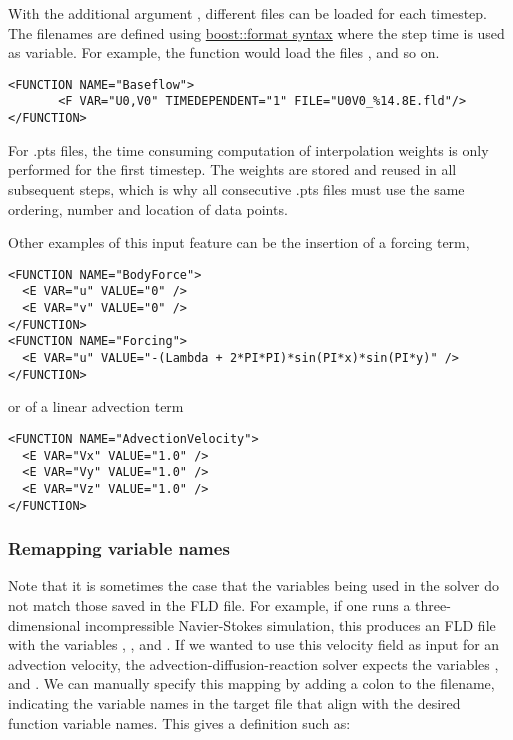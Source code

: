 With the additional argument , different files can be
loaded for each timestep. The filenames are defined using
\href{http://www.boost.org/doc/libs/1_56_0/libs/format/doc/format.html#syntax}{boost::format syntax}
where the step time is used as variable. For example, the function
 would load the files ,
 and so on.

\begin{lstlisting}[style=XMLStyle]
<FUNCTION NAME="Baseflow">
       <F VAR="U0,V0" TIMEDEPENDENT="1" FILE="U0V0_%14.8E.fld"/>
</FUNCTION>
\end{lstlisting}

For .pts files, the time consuming computation of interpolation weights is only
performed for the first timestep. The weights are stored and reused in all subsequent steps, 
which is why all consecutive .pts files must use the same ordering, number and location of
data points.

Other examples of this input feature can be the insertion of a forcing term,

\begin{lstlisting}[style=XMLStyle]
<FUNCTION NAME="BodyForce">
  <E VAR="u" VALUE="0" />
  <E VAR="v" VALUE="0" />
</FUNCTION>
<FUNCTION NAME="Forcing">
  <E VAR="u" VALUE="-(Lambda + 2*PI*PI)*sin(PI*x)*sin(PI*y)" />
</FUNCTION>
\end{lstlisting}

or of a linear advection term

\begin{lstlisting}[style=XMLStyle]
<FUNCTION NAME="AdvectionVelocity">
  <E VAR="Vx" VALUE="1.0" />
  <E VAR="Vy" VALUE="1.0" />
  <E VAR="Vz" VALUE="1.0" />
</FUNCTION>
\end{lstlisting}

\subsubsection{Remapping variable names}

Note that it is sometimes the case that the variables being used in the solver
do not match those saved in the FLD file. For example, if one runs a
three-dimensional incompressible Navier-Stokes simulation, this produces an FLD
file with the variables , ,  and . If we
wanted to use this velocity field as input for an advection velocity, the
advection-diffusion-reaction solver expects the variables , 
and . We can manually specify this mapping by adding a colon to the
filename, indicating the variable names in the target file that align with the
desired function variable names. This gives a definition such as:

